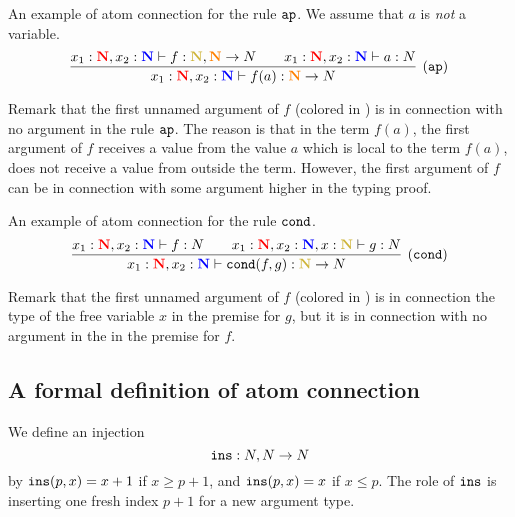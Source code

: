 \documentclass{article}
\begin{document}
\begin{Eg}\label{eg:1}\rm
An example of  atom connection for the rule ${\tt ap}$.
We assume that $a$ is \emph{not} a variable.
\[
\infer[(\ap)]
{  {x_1} : \bfColor{red}{\N},{x_2} : \bfColor{blue}{\N}
					\prove f(a) : \bfColor{orange}{\N} \rightarrow \N}
    {
	  {   {x_1} : \bfColor{red}{\N},{x_2} : \bfColor{blue}{\N}
					\prove f : \bfColor{oldgold}{\N}, \bfColor{orange}{\N} \rightarrow \N}
      {\ \ \ \ \ \ }
      {   {x_1} : \bfColor{red}{\N}, x_2: \bfColor{blue}{\N}
					\prove a : \N}
	}
\]
\end{Eg}
Remark that the first unnamed argument of $f$ (colored in ) 
is in connection with no argument in the rule ${\tt ap}$.
The reason is that in the term $f(a)$,
the first argument of $f$ receives a value from the value $a$ which is local to the term $f(a)$,
does not receive a value from outside the term.
However, the first argument of $f$ can be in connection with some argument higher in the typing proof. 

\begin{Eg}\label{eg:2}\rm
An example of  atom connection for the rule ${\tt cond}$.
\[
\infer[(\cond)]
{  {x_1} : \bfColor{red}{\N},{x_2} : \bfColor{blue}{\N}
					\prove \cond(f,g) : \bfColor{oldgold}{\N} \rightarrow \N}
    {
      {   {x_1} : \bfColor{red}{\N},{x_2} : \bfColor{blue}{\N}
					\prove f : \N}
           {\ \ \ \ \ \ }
	  {   {x_1} : \bfColor{red}{\N},{x_2} : \bfColor{blue}{\N}, x  : \bfColor{oldgold}{\N} 
					\prove g : \N}
    }
\]
\end{Eg}
Remark that the first unnamed argument of $f$ (colored in ) 
is in connection the type of the free variable $x$ in the premise for $g$,
but it is in connection with no argument in the  in the premise for $f$.


\subsection{A formal definition of atom connection}
We define an injection $${\tt ins}:{N},{N} \rightarrow{N}$$
by ${\tt ins}(p,x)=x+1$ if $x \ge p+1$, and ${\tt ins}(p,x)=x$ if $x\le p$.
The role of ${\tt ins}$ is inserting one fresh index $p+1$ for a new argument type.
\end{document}
